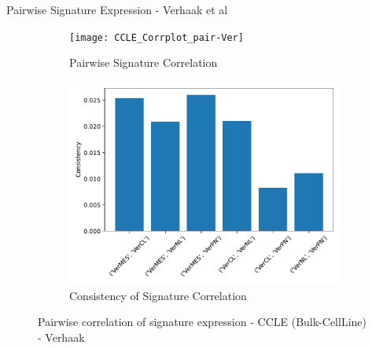 \documentclass[aspectratio=169,9pt]{beamer}
\begin{document}
    \begin{frame}{Pairwise Signature Expression - Verhaak et al}
        \begin{adjustwidth}{-5cm}{-5cm}
            \centering
            \begin{figure}\ContinuedFloat
                \centering
                \begin{subfigure}[c]{0.7\textwidth}
                    \centering
                    \texttt{[image: CCLE\_Corrplot\_pair-Ver]}
                    \caption{Pairwise Signature Correlation}
                \end{subfigure}
                \begin{subfigure}[c]{0.4\textwidth}
                    \centering
                    \includegraphics[width=\textwidth]{CCLE_Consistency_Ver}
                    \caption{Consistency of Signature Correlation}
                \end{subfigure}
                \caption{Pairwise correlation of signature expression - CCLE (Bulk-CellLine) - Verhaak}
            \end{figure}
        \end{adjustwidth}
    \end{frame}
\end{document}
